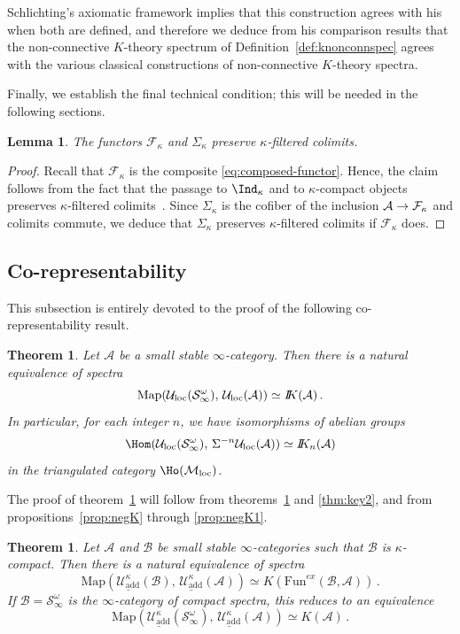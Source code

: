 \documentclass{amsart}
\renewcommand{\to}{\mathchoice{\longrightarrow}{\rightarrow}{\rightarrow}{\rightarrow}}
\newcommand{\cA}{{\mathcal A}}
\newcommand{\cB}{{\mathcal B}}
\newcommand{\cF}{{\mathcal F}}
\newcommand{\cM}{{\mathcal M}}
\newcommand{\cU}{{\mathcal U}}
\let\catsymbfont\mathcal
\newcommand{\aA}{{\catsymbfont{A}}}
\newcommand{\aB}{{\catsymbfont{B}}}
\newcommand{\aS}{{\catsymbfont{S}}}
\newcommand{\bbK}{I\mspace{-6.mu}K}
\newcommand{\Fun}{\mathrm{Fun}} %
\newcommand{\Map}{\mathrm{Map}}%
\newcommand{\ispec}{\aS_{\infty}}
\renewcommand{\i}{\infty}
\newcommand{\Motloc}{\cM_\mathrm{loc}}
\newcommand{\uUmot}{\underline{\cU_{\mathrm{add}}^\kappa}}
\newcommand{\Uloc}{\cU_{\mathrm{loc}}}
\newcommand{\kcone}{\cF_{\kappa}}
\newcommand{\ksusp}{\Sigma_{\kappa}}
\numberwithin{equation}{section}
\newtheorem{theorem}[equation]{Theorem}
\newtheorem{lemma}[equation]{Lemma}
\theoremstyle{definition}
\begin{document}
Schlichting's axiomatic framework implies that this construction
agrees with his when both are defined, and therefore we deduce from
his comparison results \cite[\S 8]{Marco} that the non-connective
$K$-theory spectrum of Definition~\ref{def:knonconnspec} agrees with
the various classical constructions of non-connective $K$-theory
spectra.  

Finally, we establish the final technical condition; this will be
needed in the following sections.

\begin{lemma}\label{lem:Ffilt}
The functors $\kcone$ and $\ksusp$ preserve $\kappa$-filtered
colimits. 
\end{lemma}

\begin{proof}
Recall that $\kcone$ is the composite \eqref{eq:composed-functor}. Hence, the claim follows from the
fact that the passage to $\Ind_\kappa$ and to $\kappa$-compact objects
preserves $\kappa$-filtered colimits~\cite[5.5.7.8, 5.5.7.10,
5.5.7.11]{HTT}.  Since $\ksusp$ is the cofiber of the inclusion
$\aA \to \kcone$ and colimits commute, we deduce that $\ksusp$
preserves $\kappa$-filtered colimits if $\kcone$ does.
\end{proof}

\subsection{Co-representability}

This subsection is entirely devoted to the proof of the following
co-representability result.

\begin{theorem}\label{thm:main3}
Let $\aA$ be a small stable $\i$-category. Then there is a natural
equivalence of spectra
\[\Map(\Uloc(\ispec^{\omega}),\,\Uloc(\aA)) \simeq \bbK(\aA)\,.\]
In particular, for each integer $n$, we have isomorphisms of abelian groups
\[\Hom(\Uloc(\ispec^{\omega}),\, \Sigma^{-n}\Uloc(\cA)) \simeq \bbK_n(\cA)\]
in the triangulated category $\Ho(\Motloc)$.
\end{theorem}
The proof of theorem~\ref{thm:main3} will follow from
theorems~\ref{thm:key1} and \ref{thm:key2}, and from
propositions~\ref{prop:negK} through \ref{prop:negK1}.

\begin{theorem}\label{thm:key1}
Let $\aA$ and $\cB$ be small stable $\i$-categories such that $\cB$ is
$\kappa$-compact. Then there is a natural equivalence of spectra
\[\Map(\uUmot(\aB),\,\uUmot(\aA)) \simeq K(\Fun^{ex}(\aB, \aA))\,.\]
If $\cB=\ispec^\omega$ is the $\i$-category of
compact spectra, this reduces to an equivalence
\[\Map(\uUmot(\ispec^\omega),\,\uUmot(\aA)) \simeq K(\aA)\,.\]
\end{theorem}
\end{document}

